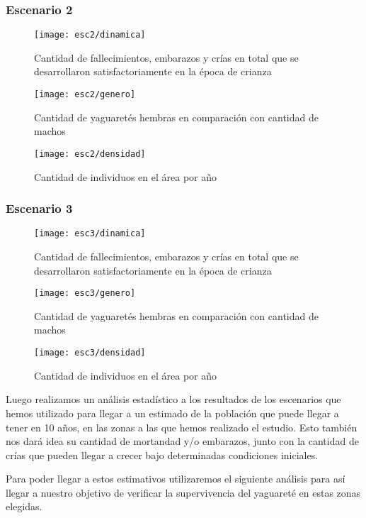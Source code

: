 \subsubsection{Escenario 2}

\begin{figure}[H]
    \texttt{[image: esc2/dinamica]}
    \caption{Cantidad de fallecimientos, embarazos y crías en total que se desarrollaron satisfactoriamente en la época de crianza}\label{fig:fig2-1}
    \endminipage\hfill
    \texttt{[image: esc2/genero]}
    \caption{Cantidad de yaguaretés hembras en comparación con cantidad de machos}\label{fig:fig2-2}
    \endminipage\hfill
    \texttt{[image: esc2/densidad]}
    \caption{Cantidad de individuos en el área por año}\label{fig:fig2-3}
    \endminipage
\end{figure}

\subsubsection{Escenario 3}

\begin{figure}[H]
    \texttt{[image: esc3/dinamica]}
    \caption{Cantidad de fallecimientos, embarazos y crías en total que se desarrollaron satisfactoriamente en la época de crianza}\label{fig:fig3-1}
    \endminipage\hfill
    \texttt{[image: esc3/genero]}
    \caption{Cantidad de yaguaretés hembras en comparación con cantidad de machos}\label{fig:fig3-2}
    \endminipage\hfill
    \texttt{[image: esc3/densidad]}
    \caption{Cantidad de individuos en el área por año}\label{fig:fig3-3}
    \endminipage
\end{figure}

Luego realizamos un análisis estadístico a los resultados de los escenarios que hemos utilizado para llegar a un
estimado de la población que puede llegar a tener en 10 años, en las zonas a las que hemos realizado
el estudio. Esto también nos dará idea su cantidad de mortandad y/o embarazos, junto con la cantidad de crías que
pueden llegar a crecer bajo determinadas condiciones iniciales.

Para poder llegar a estos estimativos utilizaremos el siguiente análisis para así llegar a nuestro objetivo de
verificar la supervivencia del yaguareté en estas zonas elegidas.


